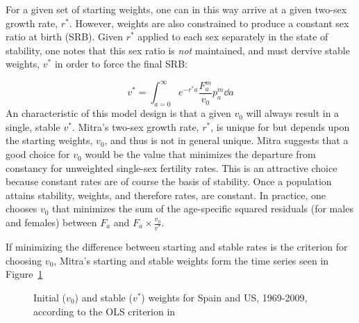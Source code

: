 For a given set of starting weights, one can in this way arrive at a given two-sex growth rate, $r^\ast$. 
However, weights are also constrained to produce a constant sex ratio at birth (SRB). Given $r^\ast$ applied 
to each sex separately in the
state of stability, one notes that this sex ratio is \textit{not} maintained,
and must dervive stable weights, $v^\ast$ in order to force the final
SRB:

\begin{equation}
v^\ast =  \int _{a = 0} ^\infty e ^{ -r^\ast a} \frac{F_a ^m}{v_0} p_a^m \dd a
\end{equation}
An characteristic of this model design is that a given $v_0$ will always result
in a single, stable $v^\ast$. Mitra's two-sex growth rate, $r^\ast$, is unique for but depends upon 
the starting weights, $v_0$, and thus is not in general unique. Mitra 
suggests that a good choice for $v_0$ would be the value that minimizes the 
departure from constancy for unweighted single-sex fertility
rates. This is an attractive choice because constant rates are of course the
basis of stability. Once a population attains stability, weights, and therefore 
rates, are constant. In practice, one
chooses $v_0$ that minimizes the sum of the age-specific squared residuals
(for males and females) between $F_a$ and $F_a \times \tfrac{v_0}{v^\ast}$. 

If minimizing the difference between starting and stable rates is the criterion
for choosing $v_0$, Mitra's starting and stable weights form the time
series seen in Figure~\ref{fig:Mitra1978v0vstar}

\begin{figure}[ht!]
        \centering  
          \caption{Initial ($v_0$) and stable ($v^\ast$) weights for Spain and
          US, 1969-2009, according to the OLS criterion in
          \citet{mitra1978derivation}}
           \quad
          \label{fig:Mitra1978v0vstar}
\end{figure}

